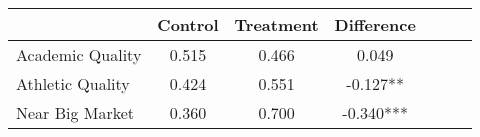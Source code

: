 \begin{tabular}{l*{6}{c}}
                    &     Control&   Treatment&  Difference   \\
\hline
Academic Quality    &       0.515&       0.466&       0.049   \\
Athletic Quality    &       0.424&       0.551&      -0.127** \\
Near Big Market     &       0.360&       0.700&      -0.340***\\
\end{tabular}
